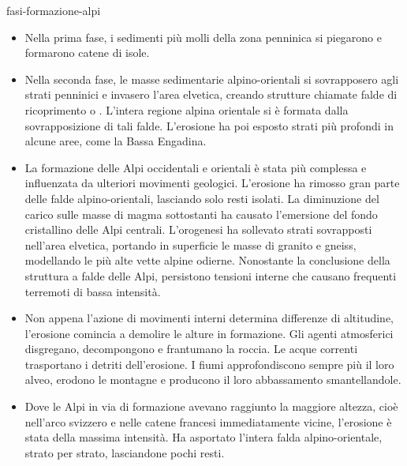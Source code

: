 \documentclass[preview]{standalone}
\begin{document}
\begin{snippet}{fasi-formazione-alpi}
    \vspace{-1cm}
    \begin{itemize}
        \item Nella prima fase, i sedimenti più molli della zona penninica si piegarono e formarono
        catene di isole.
        \item Nella seconda fase, le masse sedimentarie alpino-orientali si sovrapposero agli strati
        penninici e invasero l'area elvetica, creando strutture chiamate falde di ricoprimento o
        . L'intera regione alpina orientale si è formata dalla sovrapposizione di tali falde.
        L'erosione ha poi esposto strati più profondi in alcune aree, come la Bassa Engadina.
        \item La formazione delle Alpi occidentali e orientali è stata più complessa e influenzata da
        ulteriori movimenti geologici. L'erosione ha rimosso gran parte delle falde alpino-orientali,
        lasciando solo resti isolati. La diminuzione del carico sulle masse di magma sottostanti ha
        causato l'emersione del fondo cristallino delle Alpi centrali. L'orogenesi ha sollevato strati
        sovrapposti nell'area elvetica, portando in superficie le masse di granito e gneiss,
        modellando le più alte vette alpine odierne. Nonostante la conclusione della struttura a
        falde delle Alpi, persistono tensioni interne che causano frequenti terremoti di bassa
        intensità.
        \item Non appena l'azione di movimenti interni determina differenze di altitudine, l'erosione
        comincia a demolire le alture in formazione. Gli agenti atmosferici disgregano,
        decompongono e frantumano la roccia. Le acque correnti trasportano i detriti dell'erosione.
        I fiumi approfondiscono sempre più il loro alveo, erodono le montagne e producono il loro
        abbassamento smantellandole.
        \item Dove le Alpi in via di formazione avevano raggiunto la maggiore altezza, cioè nell'arco
        svizzero e nelle catene francesi immediatamente vicine, l'erosione è stata della massima
        intensità. Ha asportato l'intera falda alpino-orientale, strato per strato, lasciandone pochi
        resti.
    \end{itemize}
\end{snippet}
\end{document}
